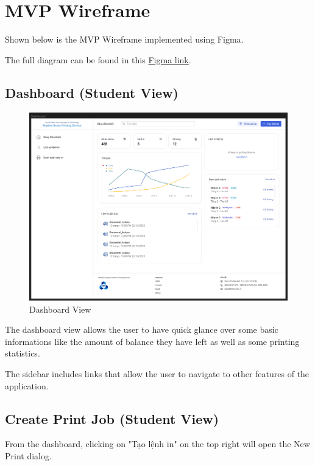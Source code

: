 \section{MVP Wireframe}

Shown below is the MVP Wireframe implemented using Figma.

The full diagram can be found in this \href{https://www.figma.com/file/Sfcv02sNfcQDcNzJZBcMjC/SE?type=design&node-id=1302-148192&mode=design}{Figma link}.

\subsection{Dashboard (Student View)}

\begin{figure}[H]
  \includegraphics[max width=0.9\linewidth]{chapters/5. mvp-wireframe/1 - Dashboard.png}
  \caption{Dashboard View}%
\end{figure}

The dashboard view allows the user to have quick glance over some basic informations like the amount of balance they have left as well as some printing statistics.\

The sidebar includes links that allow the user to navigate to other features of the application.

\subsection{Create Print Job (Student View)}

From the dashboard, clicking on "Tạo lệnh in" on the top right will open the New Print dialog.

